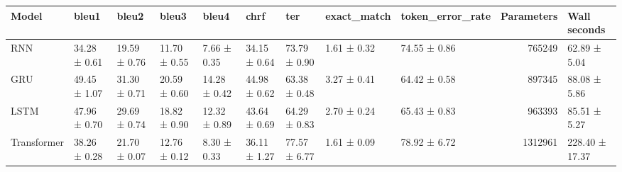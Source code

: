 \begin{tabular}{lllllllllrl}
\toprule
Model & bleu1 & bleu2 & bleu3 & bleu4 & chrf & ter & exact\_match & token\_error\_rate & Parameters & Wall seconds \\
\midrule
RNN & 34.28 ± 0.61 & 19.59 ± 0.76 & 11.70 ± 0.55 & 7.66 ± 0.35 & 34.15 ± 0.64 & 73.79 ± 0.90 & 1.61 ± 0.32 & 74.55 ± 0.86 & 765249 & 62.89 ± 5.04 \\
GRU & 49.45 ± 1.07 & 31.30 ± 0.71 & 20.59 ± 0.60 & 14.28 ± 0.42 & 44.98 ± 0.62 & 63.38 ± 0.48 & 3.27 ± 0.41 & 64.42 ± 0.58 & 897345 & 88.08 ± 5.86 \\
LSTM & 47.96 ± 0.70 & 29.69 ± 0.74 & 18.82 ± 0.90 & 12.32 ± 0.89 & 43.64 ± 0.69 & 64.29 ± 0.83 & 2.70 ± 0.24 & 65.43 ± 0.83 & 963393 & 85.51 ± 5.27 \\
Transformer & 38.26 ± 0.28 & 21.70 ± 0.07 & 12.76 ± 0.12 & 8.30 ± 0.33 & 36.11 ± 1.27 & 77.57 ± 6.77 & 1.61 ± 0.09 & 78.92 ± 6.72 & 1312961 & 228.40 ± 17.37 \\
\bottomrule
\end{tabular}
